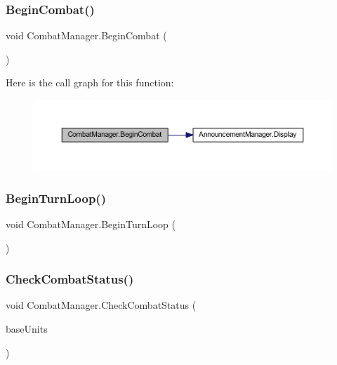 \subsubsection{\texorpdfstring{BeginCombat()}{BeginCombat()}}
{\footnotesize\ttfamily void Combat\+Manager.\+Begin\+Combat (\begin{DoxyParamCaption}{ }\end{DoxyParamCaption})}

Here is the call graph for this function\+:\nopagebreak
\begin{figure}[H]
\begin{center}
\leavevmode
\includegraphics[width=350pt]{class_combat_manager_ab5d0c356fd55e86d62b03c015754abee_cgraph}
\end{center}
\end{figure}
\mbox{\label{class_combat_manager_aa31394843beacdbfd52d683a68a7f454}} 
\subsubsection{\texorpdfstring{BeginTurnLoop()}{BeginTurnLoop()}}
{\footnotesize\ttfamily void Combat\+Manager.\+Begin\+Turn\+Loop (\begin{DoxyParamCaption}{ }\end{DoxyParamCaption})}

\mbox{\label{class_combat_manager_aea6dfda807c4ec793ed26c5d220b84fb}} 
\subsubsection{\texorpdfstring{CheckCombatStatus()}{CheckCombatStatus()}}
{\footnotesize\ttfamily void Combat\+Manager.\+Check\+Combat\+Status (\begin{DoxyParamCaption}\item[{List$<$ \mbox{\hyperlink{class_base_unit}{Base\+Unit}} $>$}]{base\+Units }\end{DoxyParamCaption})}

